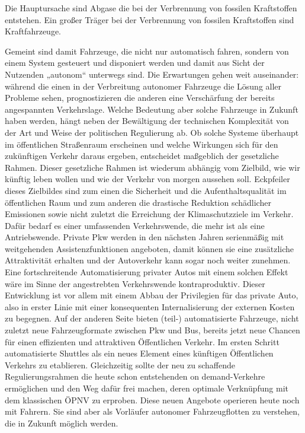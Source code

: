 Die Hauptursache sind Abgase die bei der Verbrennung von fossilen Kraftstoffen entstehen.
Ein großer Träger bei der Verbrennung von fossilen Kraftstoffen sind Kraftfahrzeuge.


Gemeint sind damit Fahrzeuge,
die nicht nur automatisch fahren, sondern von einem System gesteuert und disponiert werden und
damit aus Sicht der Nutzenden „autonom“ unterwegs sind. Die Erwartungen gehen weit auseinander: während die einen in der Verbreitung autonomer Fahrzeuge die Lösung aller Probleme sehen,
prognostizieren die anderen eine Verschärfung der bereits angespannten Verkehrslage.
Welche Bedeutung aber solche Fahrzeuge
in Zukunft haben werden, hängt neben der Bewältigung der technischen Komplexität
von der Art und Weise der politischen Regulierung ab. Ob solche Systeme überhaupt im öffentlichen
Straßenraum erscheinen und welche Wirkungen sich für den zukünftigen Verkehr daraus ergeben,
entscheidet maßgeblich der gesetzliche Rahmen.
Dieser gesetzliche Rahmen ist wiederum abhängig
vom Zielbild, wie wir künftig leben wollen und wie der Verkehr von morgen aussehen soll.
Eckpfeiler dieses Zielbildes sind zum einen die Sicherheit und die Aufenthaltsqualität im öffentlichen Raum und
zum anderen die drastische Reduktion schädlicher Emissionen sowie nicht zuletzt die Erreichung der
Klimaschutzziele im Verkehr. Dafür bedarf es einer umfassenden Verkehrswende, die mehr ist als eine Antriebswende.
Private Pkw werden in den nächsten Jahren serienmäßig mit weitgehenden Assistenzfunktionen angeboten, damit können sie eine zusätzliche Attraktivität erhalten und der Autoverkehr kann sogar
noch weiter zunehmen. Eine fortschreitende Automatisierung privater Autos mit einem solchen Effekt wäre im Sinne der angestrebten Verkehrswende kontraproduktiv.
Dieser Entwicklung ist vor allem mit einem Abbau der Privilegien für das private Auto, also in erster Linie mit einer konsequenten Internalisierung der externen Kosten zu begegnen.
Auf der anderen Seite bieten (teil-) automatisierte Fahrzeuge, nicht zuletzt neue Fahrzeugformate zwischen Pkw und Bus, bereits jetzt neue
Chancen für einen effizienten und attraktiven Öffentlichen Verkehr.
Im ersten Schritt automatisierte Shuttles als ein neues Element eines künftigen Öffentlichen Verkehrs zu etablieren.
Gleichzeitig sollte der neu zu schaffende Regulierungsrahmen die heute schon entstehenden on demand-Verkehre ermöglichen und den Weg dafür frei machen, deren optimale Verknüpfung
mit dem klassischen ÖPNV zu erproben.
Diese neuen Angebote operieren heute noch mit Fahrern.
Sie sind aber als Vorläufer autonomer Fahrzeugflotten zu verstehen, die in Zukunft möglich werden.
